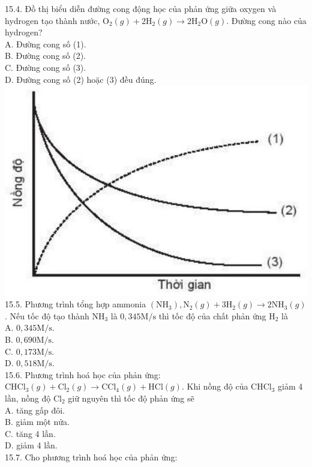 \documentclass[10pt]{article}
\begin{document}
15.4. Đồ thị biểu diễn đường cong động học của phản ứng giữa oxygen và hydrogen tạo thành nước, $\mathrm{O}_{2}(g)+2 \mathrm{H}_{2}(g) \rightarrow 2 \mathrm{H}_{2} \mathrm{O}(g)$. Đường cong nào của hydrogen?\\
A. Đường cong số (1).\\
B. Đường cong số (2).\\
C. Đường cong số (3).\\
D. Đường cong số (2) hoặc (3) đều đúng.\\
\includegraphics[max width=\textwidth, center]{2025_10_23_883c4b146e2332109fcdg-59}\\
15.5. Phương trình tổng hợp ammonia $\left(\mathrm{NH}_{3}\right), \mathrm{N}_{2}(g)+3 \mathrm{H}_{2}(g) \rightarrow 2 \mathrm{NH}_{3}(g)$. Nếu tốc độ tạo thành $\mathrm{NH}_{3}$ là $0,345 \mathrm{M} / \mathrm{s}$ thì tốc độ của chất phản ứng $\mathrm{H}_{2}$ là\\
A. $0,345 \mathrm{M} / \mathrm{s}$.\\
B. $0,690 \mathrm{M} / \mathrm{s}$.\\
C. $0,173 \mathrm{M} / \mathrm{s}$.\\
D. $0,518 \mathrm{M} / \mathrm{s}$.\\
15.6. Phương trình hoá học của phản ứng: $\mathrm{CHCl}_{3}(g)+\mathrm{Cl}_{2}(g) \rightarrow \mathrm{CCl}_{4}(g)+\mathrm{HCl}(g)$. Khi nồng độ của $\mathrm{CHCl}_{3}$ giảm 4 lần, nồng độ $\mathrm{Cl}_{2}$ giữ nguyên thì tốc độ phản ứng sẽ\\
A. tăng gấp đôi.\\
B. giảm một nửa.\\
C. tăng 4 lần.\\
D. giảm 4 lần.\\
15.7. Cho phương trình hoá học của phản ứng:
\end{document}
